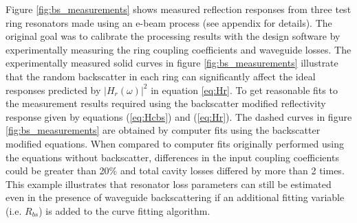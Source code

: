 \documentclass[10pt]{article}
\begin{document}
Figure \ref{fig:bs_measurements} shows measured reflection responses from three test ring resonators made using an e-beam process (see appendix for details). The original goal was to calibrate the processing results with the design software by experimentally measuring the ring coupling coefficients and waveguide losses.  The experimentally measured solid curves in figure \ref{fig:bs_measurements} illustrate that the random backscatter in each ring can significantly affect the ideal responses predicted by $|H_r(\omega)|^2$ in equation \ref{eq:Hr}.  To get reasonable fits to the measurement results required using the backscatter modified reflectivity response given by equations (\ref{eq:Hcbs}) and (\ref{eq:Hr}).  The dashed curves in figure \ref{fig:bs_measurements} are obtained by computer fits using the backscatter modified equations.  When compared to computer fits originally performed using the equations without backscatter, differences in the input coupling coefficients could be greater than 20$\%$ and total cavity losses differed by more than 2 times.  This example illustrates that resonator loss parameters can still be estimated even in the presence of waveguide backscattering if an additional fitting variable (i.e. $R_{bs}$) is added to the curve fitting algorithm.  





\label{sec:measurements}
\end{document}
